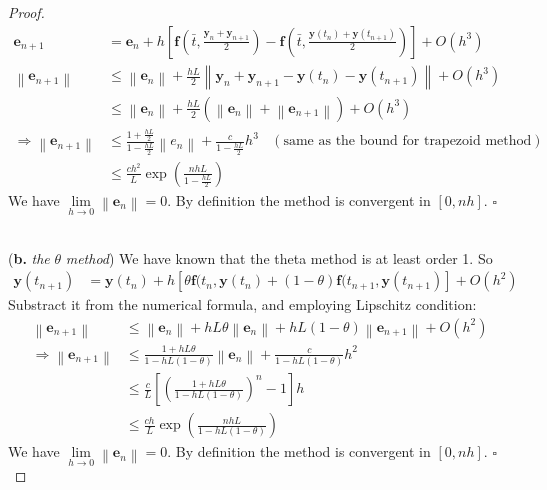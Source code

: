\documentclass[a4paper, 10pt]{article}
\theoremstyle{definition}
\theoremstyle{hSol}
\begin{document}
\begin{proof}
\begin{equation}
  \begin{split}
    \bm{e}_{n+1} &= \bm{e}_n + h\left[\bm{f}(\bar{t}, \tfrac{\bm{y}_n + \bm{y}_{n+1}}{2})-\bm{f}(\bar{t}, \tfrac{\bm{y}(t_n)+\bm{y}(t_{n+1})}{2})\right] + O(h^3) \\
    \left\|\bm{e}_{n+1}\right\|& \leq \left\|\bm{e}_n\right\| + \tfrac{hL}{2} \left\|\bm{y}_n + \bm{y}_{n+1}-\bm{y}(t_n)-\bm{y}(t_{n+1})\right\| + O(h^3) \\
    & \leq \left\|\bm{e}_n\right\| + \tfrac{hL}{2}(\left\|\bm{e}_n\right\| + \left\|\bm{e}_{n+1}\right\|) + O(h^3) \\
    \Rightarrow \left\|\bm{e}_{n+1}\right\| & \leq \frac{1+\tfrac{hL}{2}}{1-\tfrac{hL}{2}} \left\|e_n\right\| + \frac{c}{1-\tfrac{hL}{2}}h^3~~~~(\text{same as the bound for trapezoid method}) \\
    & \leq \frac{ch^2}{L}\exp{\left(\frac{nhL}{1-\frac{hL}{2}}\right)}
  \end{split}
\end{equation}
We have $\lim\limits_{h\rightarrow0} \left\|\bm{e}_n\right\| = 0$. By definition the method is convergent in $[0, nh]$. $\square$

~\\
(\textbf{b.} \emph{the} $\theta$ \emph{method}) We have known that the theta method is at least order 1. So
\begin{equation}
  \begin{split}
      \bm{y}(t_{n+1}) &= \bm{y}(t_n) + h \left[\theta \bm{f}(t_n, \bm{y}(t_n)+(1-\theta)\bm{f}(t_{n+1}, \bm{y}(t_{n+1})\right] + O(h^2)
  \end{split}
\end{equation}
Substract it from the numerical formula, and employing Lipschitz condition:
\begin{equation}
  \begin{split}
    \left\|\bm{e}_{n+1}\right\| &\leq \left\|\bm{e}_n\right\| + hL\theta \left\|\bm{e}_n\right\| + hL(1-\theta) \left\|\bm{e}_{n+1}\right\| + O(h^2) \\
    \Rightarrow \left\|\bm{e}_{n+1}\right\| &\leq \frac{1+hL\theta}{1-hL(1-\theta)} \left\|\bm{e}_n\right\| + \frac{c}{1-hL(1-\theta)}h^2 \\
    & \leq \frac{c}{L}\left[\left(\frac{1+hL\theta}{1-hL(1-\theta)} \right)^n -1\right]h \\
    & \leq \frac{ch}{L} \exp\left(\frac{nhL}{1-hL(1-\theta)}\right)
  \end{split}
\end{equation}
We have $\lim\limits_{h\rightarrow0} \left\|\bm{e}_n\right\| = 0$. By definition the method is convergent in $[0, nh]$. $\square$
\end{proof} 
\end{document}
